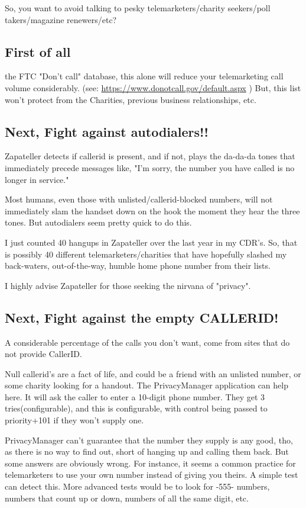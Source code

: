 So, you want to avoid talking to pesky telemarketers/charity
seekers/poll takers/magazine renewers/etc?

\subsection{First of all}

 the FTC "Don't call" database, this alone will reduce your
telemarketing call volume considerably.  (see:
\url{https://www.donotcall.gov/default.aspx} ) But, this list won't protect
from the Charities, previous business relationships, etc.

\subsection{Next, Fight against autodialers!!}

Zapateller detects if callerid is present, and if not, plays the
da-da-da tones that immediately precede messages like, "I'm sorry,
the number you have called is no longer in service."

Most humans, even those with unlisted/callerid-blocked numbers, will
not immediately slam the handset down on the hook the moment they hear
the three tones. But autodialers seem pretty quick to do this.

I just counted 40 hangups in Zapateller over the last year in my
CDR's.  So, that is possibly 40 different telemarketers/charities that have
hopefully slashed my back-waters, out-of-the-way, humble home phone
number from their lists.

I highly advise Zapateller for those seeking the nirvana of "privacy".


\subsection{Next, Fight against the empty CALLERID!}

A considerable percentage of the calls you don't want, come from
sites that do not provide CallerID.

Null callerid's are a fact of life, and could be a friend with an
unlisted number, or some charity looking for a handout. The
PrivacyManager application can help here. It will ask the caller to
enter a 10-digit phone number. They get 3 tries(configurable), and this is
configurable, with control being passed to priority+101 if they won't
supply one.

PrivacyManager can't guarantee that the number they supply is any
good, tho, as there is no way to find out, short of hanging up and
calling them back. But some answers are obviously wrong. For instance,
it seems a common practice for telemarketers to use your own number
instead of giving you theirs. A simple test can detect this. More
advanced tests would be to look for -555- numbers, numbers that count
up or down, numbers of all the same digit, etc.

